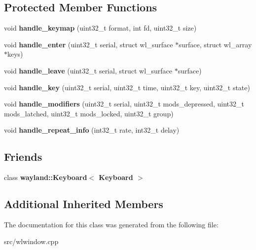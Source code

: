 \subsection*{Protected Member Functions}
\begin{DoxyCompactItemize}
\item 
\mbox{\label{classKeyboard_a98438a6ae4ca9646247de9073400a1fd}} 
void {\bfseries handle\+\_\+keymap} (uint32\+\_\+t format, int fd, uint32\+\_\+t size)
\item 
\mbox{\label{classKeyboard_a077d0138dfac2d1e3839e9538add3026}} 
void {\bfseries handle\+\_\+enter} (uint32\+\_\+t serial, struct wl\+\_\+surface $\ast$surface, struct wl\+\_\+array $\ast$keys)
\item 
\mbox{\label{classKeyboard_ab487a5d96b805e6425e524d2d3928c70}} 
void {\bfseries handle\+\_\+leave} (uint32\+\_\+t serial, struct wl\+\_\+surface $\ast$surface)
\item 
\mbox{\label{classKeyboard_a33e32f700a19075bb475a5bd5a1be417}} 
void {\bfseries handle\+\_\+key} (uint32\+\_\+t serial, uint32\+\_\+t time, uint32\+\_\+t key, uint32\+\_\+t state)
\item 
\mbox{\label{classKeyboard_a3946ded9f8b41b28695142e956219e08}} 
void {\bfseries handle\+\_\+modifiers} (uint32\+\_\+t serial, uint32\+\_\+t mods\+\_\+depressed, uint32\+\_\+t mods\+\_\+latched, uint32\+\_\+t mods\+\_\+locked, uint32\+\_\+t group)
\item 
\mbox{\label{classKeyboard_ab4d18a367ed82378a181281a0965cd3f}} 
void {\bfseries handle\+\_\+repeat\+\_\+info} (int32\+\_\+t rate, int32\+\_\+t delay)
\end{DoxyCompactItemize}
\subsection*{Friends}
\begin{DoxyCompactItemize}
\item 
\mbox{\label{classKeyboard_ac31b40bd6bbad91f8f449d0156026f7a}} 
class {\bfseries wayland\+::\+Keyboard$<$ Keyboard $>$}
\end{DoxyCompactItemize}
\subsection*{Additional Inherited Members}


The documentation for this class was generated from the following file\+:\begin{DoxyCompactItemize}
\item 
src/wlwindow.\+cpp\end{DoxyCompactItemize}

